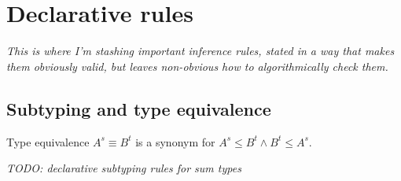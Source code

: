 \documentclass{rntz}
\newcommand{\todo}[1]{{\itshape\color{blue}#1}}
\newcommand{\GG}{\Gamma}
\newcommand{\x}{\times}
\begin{document}







\section{Declarative rules}

\todo{This is where I'm stashing important inference rules, stated in a way that
  makes them obviously valid, but leaves non-obvious how to algorithmically
  check them.}

\subsection{Subtyping and type equivalence}
Type equivalence $A^s \equiv B^t$ is a synonym for $A^s \le B^t \wedge B^t \le
A^s$.

\todo{TODO: declarative subtyping rules for sum types}
\end{document}
